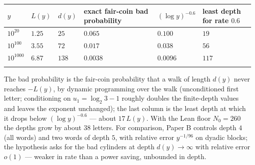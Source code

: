 \documentclass[11pt,a4paper]{article}
\begin{document}
\begin{longtable}[]{@{}
  >{\raggedright\arraybackslash}p{}
  >{\raggedright\arraybackslash}p{}
  >{\raggedright\arraybackslash}p{}
  >{\raggedright\arraybackslash}p{}
  >{\raggedright\arraybackslash}p{}
  >{\raggedright\arraybackslash}p{}@{}}
\toprule\noalign{}
\begin{minipage}[b]{\linewidth}\raggedright
\(y\)
\end{minipage} & \begin{minipage}[b]{\linewidth}\raggedright
\(L(y)\)
\end{minipage} & \begin{minipage}[b]{\linewidth}\raggedright
\(d(y)\)
\end{minipage} & \begin{minipage}[b]{\linewidth}\raggedright
exact fair-coin bad probability
\end{minipage} & \begin{minipage}[b]{\linewidth}\raggedright
\((\log y)^{-0.6}\)
\end{minipage} & \begin{minipage}[b]{\linewidth}\raggedright
least depth for rate \(0.6\)
\end{minipage} \\
\midrule\noalign{}
\endhead
\bottomrule\noalign{}
\endfoot
\bottomrule\noalign{}
\endlastfoot
\(10^{20}\) & \(1.25\) & \(25\) & \(0.065\) & \(0.100\) & \(19\) \\
\(10^{100}\) & \(3.55\) & \(72\) & \(0.017\) & \(0.038\) & \(56\) \\
\(10^{1000}\) & \(6.87\) & \(138\) & \(0.0038\) & \(0.0096\) &
\(117\) \\*
\end{longtable}

\endgroup

The bad probability is the fair-coin probability that a walk of length
\(d(y)\) never reaches \(-L(y)\), by dynamic programming over the walk
(unconditioned first letter; conditioning on \(u_1=\log_2 3-1\) roughly
doubles the finite-depth values and leaves the exponent unchanged); the
last column is the least depth at which it drops below
\((\log y)^{-0.6}\) --- about \(17\,L(y)\). With the Lean floor
\(N_0=260\) the depths grow by about \(38\) letters. For comparison,
Paper B controls depth \(4\) (all words) and two words of depth \(5\),
with relative error \(y^{-1/96}\) on dyadic blocks; the hypothesis asks
for the bad cylinders at depth \(d(y)\to\infty\) with relative error
\(o(1)\) --- weaker in rate than a power saving, unbounded in depth.
\end{document}

